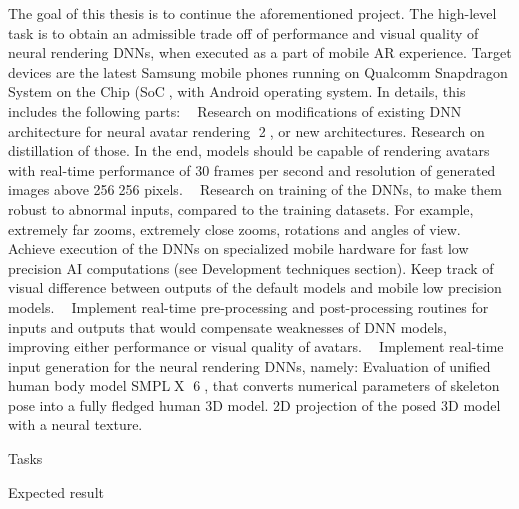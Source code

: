  
 The goal of this thesis is to continue the aforementioned project. The high-level task is
 to obtain an admissible trade off of performance and visual quality of neural rendering
 DNNs, when executed as a part of mobile AR experience. Target devices are the latest
 Samsung mobile phones running on Qualcomm Snapdragon System on the Chip (SoC,
 with Android operating system.
 In details, this includes the following parts:
  Research on modifications of existing DNN architecture for neural avatar rendering
 2, or new architectures. Research on distillation of those. In the end, models
 should be capable of rendering avatars with real-time performance of 30 frames
 per second and resolution of generated images above 256256 pixels.
  Research on training of the DNNs, to make them robust to abnormal inputs,
 compared to the training datasets. For example, extremely far zooms, extremely
 close zooms, rotations and angles of view.
  Achieve execution of the DNNs on specialized mobile hardware for fast low
 precision AI computations (see Development techniques section). Keep track of
 visual difference between outputs of the default models and mobile low precision
 models.
  Implement real-time pre-processing and post-processing routines for inputs and
 outputs that would compensate weaknesses of DNN models, improving either
 performance or visual quality of avatars.
  Implement real-time input generation for the neural rendering DNNs, namely:
 Evaluation of unified human body model SMPLX 6, that converts numerical
 parameters of skeleton pose into a fully fledged human 3D model.
 2D projection of the posed 3D model with a neural texture.
 
 Tasks

Expected result




